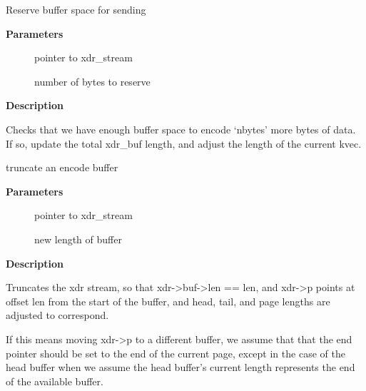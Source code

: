 \documentclass[a4paper,8pt,english]{sphinxmanual}
\begin{document}
\begin{fulllineitems}
\label{networking/kapi:c.xdr_reserve_space}
Reserve buffer space for sending

\end{fulllineitems}


\textbf{Parameters}
\begin{description}
\item[{}] \leavevmode
pointer to xdr\_stream

\item[{}] \leavevmode
number of bytes to reserve

\end{description}

\textbf{Description}

Checks that we have enough buffer space to encode `nbytes' more
bytes of data. If so, update the total xdr\_buf length, and
adjust the length of the current kvec.

\begin{fulllineitems}
\label{networking/kapi:c.xdr_truncate_encode}
truncate an encode buffer

\end{fulllineitems}


\textbf{Parameters}
\begin{description}
\item[{}] \leavevmode
pointer to xdr\_stream

\item[{}] \leavevmode
new length of buffer

\end{description}

\textbf{Description}

Truncates the xdr stream, so that xdr-\textgreater{}buf-\textgreater{}len == len,
and xdr-\textgreater{}p points at offset len from the start of the buffer, and
head, tail, and page lengths are adjusted to correspond.

If this means moving xdr-\textgreater{}p to a different buffer, we assume that
that the end pointer should be set to the end of the current page,
except in the case of the head buffer when we assume the head
buffer's current length represents the end of the available buffer.
\end{document}
